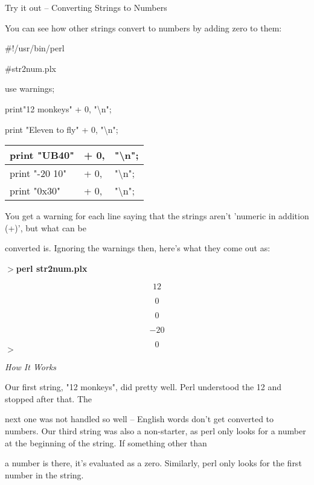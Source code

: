 \documentclass[a4paper,11pt]{book}
\begin{document}
\noindent 

\noindent 

\noindent Try it out -- Converting Strings to Numbers

\noindent You can see how other strings convert to numbers by adding zero to them:

\noindent 

\noindent \#!/usr/bin/perl

\noindent \#str2num.plx

\noindent use warnings;

\noindent print"12 monkeys" + 0,  "\textbackslash n";

\noindent print "Eleven to fly" + 0,  "\textbackslash n";

\begin{tabular}{|p{1.3in}|p{0.4in}|p{2.5in}|} \hline 
print "UB40" & + 0, & "\textbackslash n"; \\ \hline 
print "-20 10" & + 0, & "\textbackslash n"; \\ \hline 
print "0x30" & + 0, & "\textbackslash n"; \\ \hline 
\end{tabular}



\noindent You get a warning for each line saying that the strings aren't 'numeric in addition (+)', but what can be

\noindent converted is. Ignoring the warnings then, here's what they come out as:

\noindent 

\noindent $>$\textbf{perl str2num.plx}

\[12\] 

\[0\] 

\[0\] 

\[-20\] 

\[0\] 
$>$

\noindent 

\noindent \textit{How It Works}

\noindent Our first string, "12 monkeys", did pretty well. Perl understood the 12 and stopped after that. The

\noindent next one was not handled so well -- English words don't get converted to numbers. Our third string was also a non-starter, as perl only looks for a number at the beginning of the string. If something other than

\noindent a number is there, it's evaluated as a zero. Similarly, perl only looks for the first number in the string.
\end{document}
